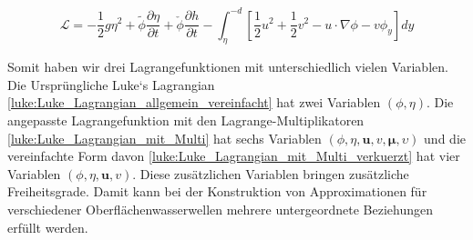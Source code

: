 \begin{equation}
	\mathscr{L}
	=
	-
	\frac{1}{2} g \eta^2
	+
	\widetilde{\phi} \frac{\partial\eta}{\partial t}
	+
	\check{\phi} \frac{\partial h}{\partial t}
	-
	\int_{\eta}^{-d} \left[ \frac{1}{2} u^2 + \frac{1}{2} v^2 - u \cdot \nabla \phi - v \phi_y \right] dy 
	\label{luke:Luke_Lagrangian_mit_Multi_verkuerzt}
\end{equation}

Somit haben wir drei Lagrangefunktionen mit unterschiedlich vielen Variablen.
Die Ursprüngliche Luke`s Lagrangian \eqref{luke:Luke_Lagrangian_allgemein_vereinfacht} hat zwei Variablen $(\phi, \eta)$.
Die angepasste Lagrangefunktion mit den Lagrange-Multiplikatoren \eqref{luke:Luke_Lagrangian_mit_Multi} hat sechs Variablen $(\phi, \eta, \bm{u}, v, \bm{\mu}, \upsilon)$ und die vereinfachte Form davon \eqref{luke:Luke_Lagrangian_mit_Multi_verkuerzt} hat vier Variablen $(\phi, \eta, \bm{u}, v)$.
Diese zusätzlichen Variablen bringen zusätzliche Freiheitsgrade. Damit kann bei der Konstruktion von Approximationen für verschiedener Oberflächenwasserwellen mehrere untergeordnete Beziehungen erfüllt werden.
















